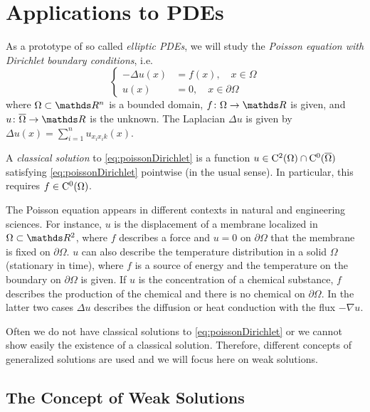 \chapter{Applications to PDEs}
\label{chap:appsToPDEs}

As a prototype of so called \emph{elliptic PDEs}, we will study the \emph{Poisson equation with Dirichlet boundary conditions}, i.e.
\begin{equation}
  \label{eq:poissonDirichlet}
  \begin{cases}
    -\Delta u(x) &= f(x), \quad x \in \Omega \\
    u(x) &= 0, \quad x \in \partial\Omega
  \end{cases}
\end{equation}
where $\Omega \subset \R^n$ is a bounded domain, $f \colon \Omega \to \R$ is given, and $u \colon \overline \Omega \to \R$ is the unknown.
The Laplacian $\Delta u$ is given by $\Delta u(x) = \sum_{i = 1}^n u_{x_i x_ik}(x)$.

\begin{defn}
  A \emph{classical solution} to \eqref{eq:poissonDirichlet} is a function $u \in \mathrm{C}^2(\Omega) \cap \mathrm{C}^0(\overline\Omega)$ satisfying \eqref{eq:poissonDirichlet} pointwise (in the usual sense).
  In particular, this requires $f \in \mathrm{C}^0(\Omega)$.
\end{defn}

  The Poisson equation appears in different contexts in natural and engineering sciences.
  For instance, $u$ is the displacement of a membrane localized in $\Omega \subset \R^2$, where $f$ describes a force and $u = 0$ on $\partial\Omega$ that the membrane is fixed on $\partial\Omega$.
  $u$ can also describe the temperature distribution in a solid $\Omega$ (stationary in time), where $f$ is a source of energy and the temperature on the boundary on $\partial\Omega$ is given.
  If $u$ is the concentration of a chemical substance, $f$ describes the production of the chemical and there is no chemical on $\partial\Omega$.
  In the latter two cases $\Delta u$ describes the diffusion or heat conduction with the flux $-\nabla u$.

  Often we do not have classical solutions to \eqref{eq:poissonDirichlet} or we cannot show easily the existence of a classical solution.
  Therefore, different concepts of generalized solutions are used and we will focus here on weak solutions.

\section{The Concept of Weak Solutions}

